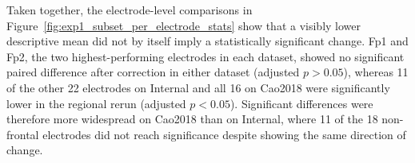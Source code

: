 Taken together, the electrode-level comparisons in Figure~\ref{fig:exp1_subset_per_electrode_stats} show that a visibly lower descriptive mean did not by itself imply a statistically significant change. Fp1 and Fp2, the two highest-performing electrodes in each dataset, showed no significant paired difference after correction in either dataset (adjusted $p > 0.05$), whereas 11 of the other 22 electrodes on Internal and all 16 on Cao2018 were significantly lower in the regional rerun (adjusted $p < 0.05$). Significant differences were therefore more widespread on Cao2018 than on Internal, where 11 of the 18 non-frontal electrodes did not reach significance despite showing the same direction of change.
